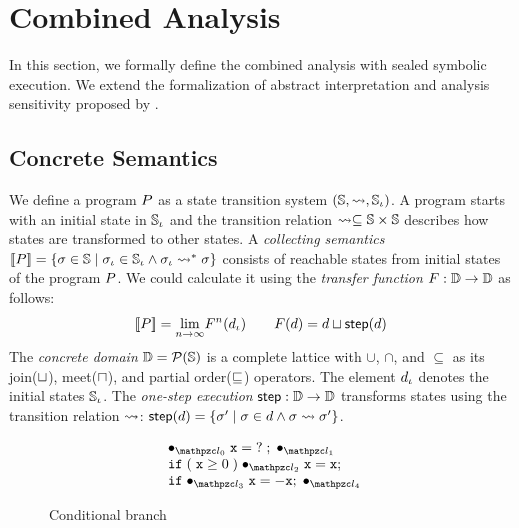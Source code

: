 \section{Combined Analysis}\label{sec:formal}

In this section, we formally define the combined analysis with sealed symbolic
execution.  We extend the formalization of abstract interpretation and analysis
sensitivity proposed by \citet{sens-toplas}.


\subsection{Concrete Semantics}

We define a program $P$ as a state transition system $(\mathbb{S}, \leadsto,
\mathbb{S}_\iota)$.  A program starts with an initial state in $\mathbb{S}_\iota$ and the
transition relation $\leadsto \subseteq \mathbb{S} \times \mathbb{S}$ describes how states
are transformed to other states.  A \textit{collecting semantics} $[\![{P}]\!] =
\{ \sigma \in \mathbb{S} \mid \sigma_\iota \in \mathbb{S}_\iota \wedge \sigma_\iota \leadsto^* \sigma \}$ consists of
reachable states from initial states of the program $P$.  We could calculate
it using the \textit{transfer function} $F: \mathbb{D} \rightarrow \mathbb{D}$ as
follows:
\[
  [\![{P}]\!] = \underset{n \rightarrow \infty}{\lim}{F^n(d_\iota)}\\
  \qquad
  F(d) = d \sqcup \textsf{step}(d)\\
\]
The \textit{concrete domain} $\mathbb{D} = \mathcal{P}(\mathbb{S})$ is a complete lattice
with $\cup$, $\cap$, and $\subseteq$ as its join($\sqcup$), meet($\sqcap$), and
partial order($\sqsubseteq$) operators.  The element $d_\iota$ denotes the initial
states $\mathbb{S}_\iota$.  The \textit{one-step execution} $\textsf{step}: \mathbb{D} \rightarrow
\mathbb{D}$ transforms states using the transition relation $\leadsto$: $\textsf{step}(d) =
\{ \sigma' \mid \sigma \in d \wedge \sigma \leadsto \sigma' \}$.

\begin{figure}[H]
  \[
    \begin{array}{l}
      \enspace \labdot{0} \; \varx = \;? \; ;  \; \labdot{1}\\
      \enspace \kwif \; (\; \varx \geq 0 \;) \; \labdot{2} \; \varx = \varx ;\\
      \enspace \kwelse \; \labdot{3} \; \varx = -\varx ;  \; \labdot{4}\\
    \end{array}
  \]
  \vspace*{-1em}
  \caption{Conditional branch}
  \label{fig:running-example}
\end{figure}

